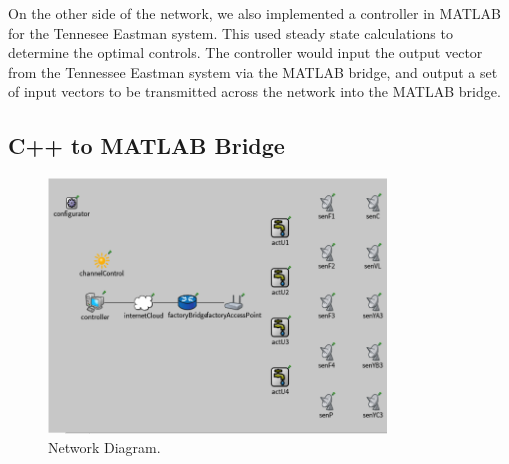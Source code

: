   On the other side of the network, we also implemented a 
  controller in MATLAB for the Tennesee Eastman system.  This
  used steady state calculations to determine the optimal controls.
  The controller would input the output vector from the Tennessee
  Eastman system via the MATLAB bridge, and output a set of input
  vectors to be transmitted across the network into the MATLAB
  bridge.

\subsection{C++ to MATLAB Bridge}

\begin{figure}
        \centering
		\includegraphics[width=0.8\textwidth]{figs/network.png}
        \caption{Network Diagram.}
        \label{fig:system}        
\end{figure}
